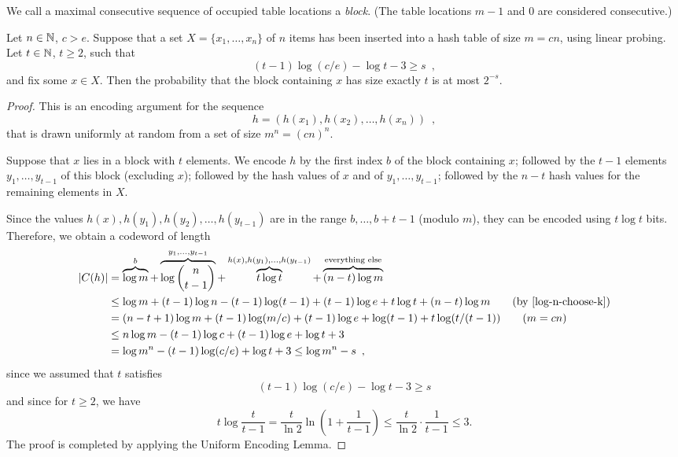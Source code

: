 \documentclass[format=acmsmall, review=false, screen=true]{acmart}
\begin{document}
We call a maximal consecutive sequence of occupied table locations a
\emph{block}. (The table locations $m-1$ and $0$ are considered
consecutive.)

\begin{thm}
  Let $n \in \mathbb{N}$, $c > e$.
  Suppose that a set $X = \{x_1, \dots, x_n\}$ of $n$ items 
  has been inserted into a hash table of size $m = cn$, using linear 
  probing.
  Let $t \in \mathbb{N}$, $t \geq 2$, such that
  \[
    (t-1) \log (c/e) - \log t - 3 \ge s \enspace ,
  \]
  and fix some $x\in X$. 
  Then the probability that the block containing
  $x$ has size exactly $t$
  is at most $2^{-s}$.
\end{thm}

\begin{proof}
  This is an encoding argument for 
  the sequence
  \[
    h = (h(x_1),h(x_2),\ldots,h(x_n)) \enspace ,
  \]
  that is drawn uniformly at random from a set of size
  $m^n = (cn)^n$.
  
  Suppose that $x$ lies in a block with $t$ elements.
  We encode $h$ by the first index $b$ of the block containing $x$;
  followed by the $t-1$ elements $y_1,\dots,y_{t-1}$ of this block
  (excluding $x$); followed by the hash
  values of $x$ and of $y_1,\dots,y_{t-1}$; followed by
  the $n-t$ hash values for the remaining elements in $X$.

  Since the values $h(x),h(y_1),h(y_2),\ldots,h(y_{t-1})$ are in the range
  $b,\ldots,b+t-1$ (modulo $m$), they can be encoded using
  $t\log t$ bits.  Therefore, 
  we obtain a codeword of length 
  \begin{align*}
    |C(h)| & = \overbrace{\log m}^{b} + \overbrace{\log\binom{n}{t-1}}^{y_1,\ldots,y_{t-1}} + \overbrace{t\log t}^{h(x),h(y_1),\ldots,h(y_{t-1})} + \overbrace{(n-t)\log m}^{\text{everything else}} \\
           & \le \log m + (t-1)\log n - 
             (t-1)\log(t-1) + (t-1)\log e + t\log t + (n-t)\log m \tag{by \eqref{log-n-choose-k}}\\
	  &=
         (n-t+1)\log m + (t-1)\log (m/c) + (t-1)\log e + \log (t-1)+ t\log(t/(t-1)) \tag{$m = cn$}\\
           & \leq n\log m - (t-1)\log c + (t-1)\log e + \log t + 3 \\
           & = \log m^n - (t-1)\log(c/e) + \log t + 3 
            \le \log m^n - s \enspace ,
  \end{align*}
  since we assumed that $t$ satisfies
  \[
    (t-1) \log (c/e) - \log t - 3 \ge s 
  \]
  and since for $t \geq 2$, we have
  \[
   t\log\frac{t}{t-1} = \frac{t}{\ln 2} \ln 
   \left(1 + \frac{1}{t-1}\right) 
   \leq \frac{t}{\ln 2} \cdot \frac{1}{t-1}
   \leq 3.
  \]
  The proof is completed by applying the Uniform Encoding Lemma.
\end{proof}
\end{document}

